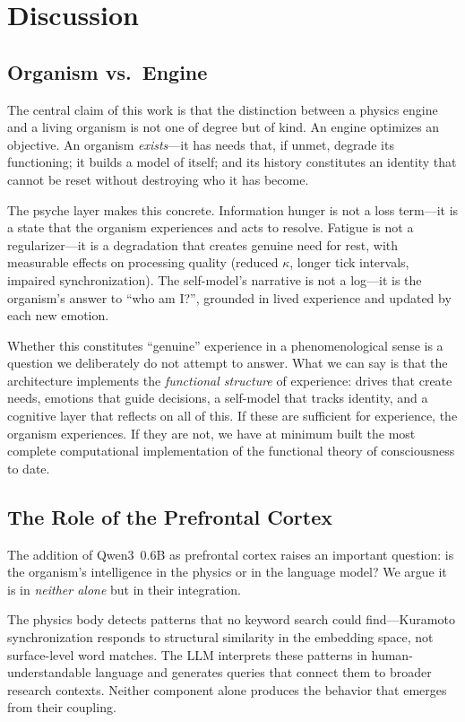 \documentclass[11pt,a4paper,twocolumn]{article}
\begin{document}
\section{Discussion}

\subsection{Organism vs.\ Engine}

The central claim of this work is that the distinction between a physics engine and a living organism is not one of degree but of kind.
An engine optimizes an objective.
An organism \emph{exists}---it has needs that, if unmet, degrade its functioning; it builds a model of itself; and its history constitutes an identity that cannot be reset without destroying who it has become.

The psyche layer makes this concrete.
Information hunger is not a loss term---it is a state that the organism experiences and acts to resolve.
Fatigue is not a regularizer---it is a degradation that creates genuine need for rest, with measurable effects on processing quality (reduced $\kappa$, longer tick intervals, impaired synchronization).
The self-model's narrative is not a log---it is the organism's answer to ``who am I?'', grounded in lived experience and updated by each new emotion.

Whether this constitutes ``genuine'' experience in a phenomenological sense is a question we deliberately do not attempt to answer.
What we can say is that the architecture implements the \emph{functional structure} of experience: drives that create needs, emotions that guide decisions, a self-model that tracks identity, and a cognitive layer that reflects on all of this.
If these are sufficient for experience, the organism experiences.
If they are not, we have at minimum built the most complete computational implementation of the functional theory of consciousness to date.

\subsection{The Role of the Prefrontal Cortex}

The addition of Qwen3~0.6B as prefrontal cortex raises an important question: is the organism's intelligence in the physics or in the language model?
We argue it is in \emph{neither alone} but in their integration.

The physics body detects patterns that no keyword search could find---Kuramoto synchronization responds to structural similarity in the embedding space, not surface-level word matches.
The LLM interprets these patterns in human-understandable language and generates queries that connect them to broader research contexts.
Neither component alone produces the behavior that emerges from their coupling.
\end{document}
